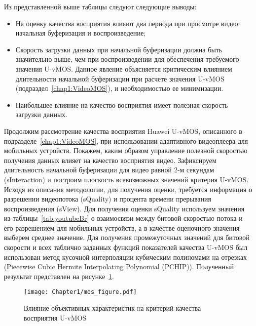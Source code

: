 Из представленной выше таблицы следуют следующие выводы:
\begin{itemize}
	\item На оценку качества восприятия влияют два периода при просмотре видео: начальная буферизация и воспроизведение;
	\item Скорость загрузки данных при начальной буферизации должна быть значительно выше, чем при воспроизведении для обеспечения требуемого значения U-vMOS. Данное явление объясняется критическим влиянием длительности начальной буферизации при расчете значения U-vMOS (подраздел~\ref{chap1:VideoMOS}), и необходимостью ее минимизации.
	\item Наибольшее влияние на качество восприятия имеет полезная скорость загрузки данных.
\end{itemize}

Продолжим рассмотрение качества восприятия Huawei U-vMOS, описанного в подразделе~\ref{chap1:VideoMOS}, при использовании адаптивного видеоплеера для мобильных устройств. Покажем, каким образом управление полезной скоростью получения данных влияет на качество восприятия видео. Зафиксируем длительность начальной буферизации для видео равной 2-м секундам (sInteraction) и построим плоскость всевозможных значений критерия U-vMOS. Исходя из описания методологии, для получения оценки, требуется информация о разрешении видеопотока (sQuality) и процента времени прерывания воспроизведения (sView). Для получения оценки sQuality используем значения из таблицы~\ref{tab:youtubeBr} о взаимосвязи между битовой скоростью потока и его разрешением для мобильных устройств, а в качестве оценочного значения выберем среднее значение. Для получения промежуточных значений для битовой скорости и всех таблично заданных функций показателей качества U-vMOS был использован метод кусочной интерполяции кубическим полиномами на отрезках (Piecewise Cubic Hermite Interpolating Polynomial (PCHIP)). Полученный результат представлен на рисунке~\ref{fig:UvMOSDepending}.

\begin{figure}[htbp]
\begin{center}
\texttt{[image: Chapter1/mos\_figure.pdf]}
\caption{Влияние объективных характеристик на критерий качества восприятия U-vMOS}
\label{fig:UvMOSDepending}
\end{center}
\end{figure}

